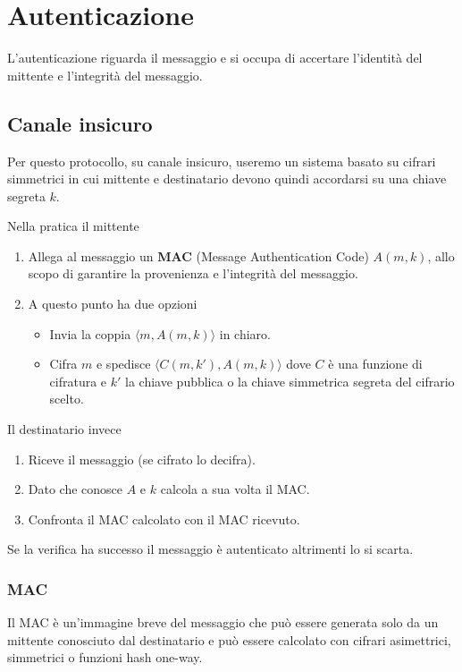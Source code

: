 \section{Autenticazione}
L'autenticazione riguarda il messaggio e si occupa di accertare l'identit\`a del mittente e l'integrit\`a del
messaggio.

\subsection{Canale insicuro}
Per questo protocollo, su canale insicuro, useremo un sistema basato su cifrari simmetrici in cui mittente e
destinatario devono quindi accordarsi su una chiave segreta $k$.

Nella pratica il mittente
\begin{enumerate}
	\item Allega al messaggio un \textbf{MAC} (Message Authentication Code) $A(m, k)$, allo scopo di garantire la
	      provenienza e l'integrit\`a del messaggio.
	\item A questo punto ha due opzioni
	      \begin{itemize}
		      \item Invia la coppia $\langle m, A(m, k) \rangle$ in chiaro.
		      \item Cifra $m$ e spedisce $\langle C(m, k'), A(m, k) \rangle$ dove $C$ \`e una funzione di cifratura
		            e $k'$ la chiave pubblica o la chiave simmetrica segreta del cifrario scelto.
	      \end{itemize}
\end{enumerate}

Il destinatario invece
\begin{enumerate}
	\item Riceve il messaggio (se cifrato lo decifra).
	\item Dato che conosce $A$ e $k$ calcola a sua volta il MAC.
	\item Confronta il MAC calcolato con il MAC ricevuto.
\end{enumerate}
Se la verifica ha successo il messaggio \`e autenticato altrimenti lo si scarta.

\subsubsection{MAC}
Il MAC \`e un'immagine breve del messaggio che pu\`o essere generata solo da un mittente conosciuto dal destinatario
e pu\`o essere calcolato con cifrari asimettrici, simmetrici o funzioni hash one-way.

